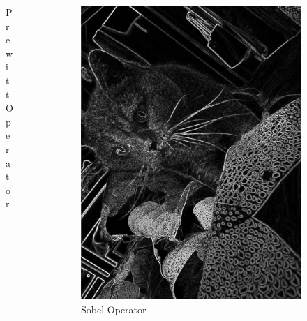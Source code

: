 \begin{frame}
\begin{columns}
\begin{column}{0.33\textwidth}
\begin{figure}
					\caption[Prewitt Operator]{Prewitt Operator}
					\label{fig:KadsePrewitt}
				\end{figure}
		\end{column}
		\begin{column}{0.33\textwidth}
			\begin{figure}
				\centering
				\includegraphics[width=0.8\linewidth]{images/KadseSobel}
				\caption[Sobel Operator]{Sobel Operator}
				\label{fig:KadseSobel}
			\end{figure}
		\end{column}
	\end{columns}
\end{frame}
